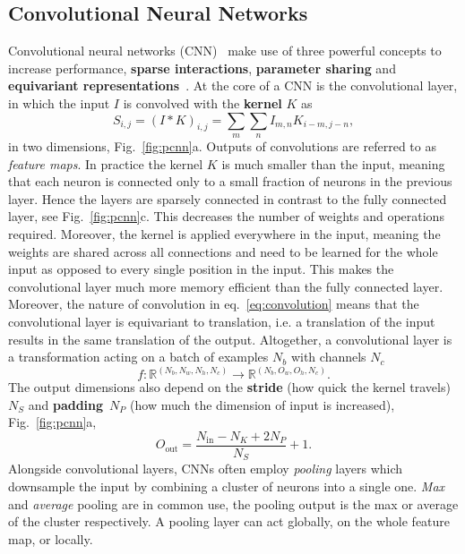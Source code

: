 \subsection{Convolutional Neural Networks}
\label{subsec:nn-cnn} 
Convolutional neural networks (CNN)~\cite{lecun1989generalization} make use of three powerful concepts to increase performance, \textbf{sparse interactions}, \textbf{parameter sharing} and \textbf{equivariant representations}~\cite{goodfellow2016deep}. At the core of a CNN is the {convolutional} layer, in which the input $I$ is convolved with the \textbf{kernel} $K$ as 
\begin{equation}
	\label{eq:convolution}
	S_{i,j} = (I * K)_{i,j} = \sum_m \sum_n I_{m,n} K_{i-m, j-n},
\end{equation}
in two dimensions, Fig.~\ref{fig:pcnn}a. Outputs of convolutions are referred to as \emph{feature maps}. In practice the kernel $K$ is much smaller than the input, meaning that each neuron is connected only to a small fraction of neurons in the previous layer. Hence the layers are sparsely connected in contrast to the fully connected layer, see Fig.~\ref{fig:pcnn}c. This decreases the number of weights and operations required. Moreover, the kernel is applied everywhere in the input, meaning the weights are shared across all connections and need to be learned for the whole input as opposed to every single position in the input. This makes the convolutional layer much more memory efficient than the fully connected layer. Moreover, the nature of convolution in eq.~\eqref{eq:convolution} means that the convolutional layer is equivariant to translation, i.e. a translation of the input results in the same translation of the output. Altogether, a convolutional layer is a transformation acting on a batch of examples $N_b$ with channels $N_c$
\begin{equation}
	f: \mathbb{R}^{(N_b, N_w, N_h, N_c)} \rightarrow \mathbb{R}^{(N_b, O_w, O_h, N_c)}.
\end{equation}
The output dimensions also depend on the \textbf{stride} (how quick the kernel travels)~$N_S$ and \textbf{padding}~$N_P$ (how much the dimension of input is increased), Fig.~\ref{fig:pcnn}a,
\begin{equation}
	O_{\text{out}} = \frac{N_{\text{in}}-N_K+2N_P}{N_S}+1.
\end{equation}
Alongside convolutional layers, CNNs often employ \emph{pooling} layers which downsample the input by combining a cluster of neurons into a single one. \emph{Max} and \emph{average} pooling are in common use, the pooling output is the max or average of the cluster respectively. A pooling layer can act globally, on the whole feature map, or locally. 

